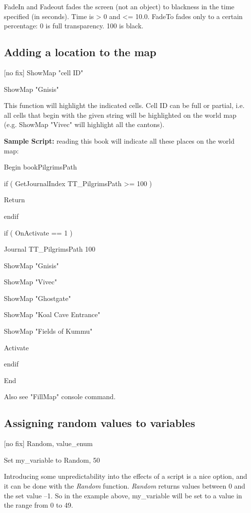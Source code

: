 \documentclass[
]{article}
\begin{document}
FadeIn and Fadeout fades the screen (not an object) to blackness in the
time specified (in seconds). Time is \textgreater{} 0 and \textless=
10.0. FadeTo fades only to a certain percentage: 0 is full transparency.
100 is black.

\hypertarget{adding-a-location-to-the-map}{%
\subsection{Adding a location to the
map}\label{adding-a-location-to-the-map}}

{[}no fix{]} ShowMap "cell ID"

ShowMap "Gnisis"

This function will highlight the indicated cells. Cell ID can be full or
partial, i.e. all cells that begin with the given string will be
highlighted on the world map (e.g. ShowMap "Vivec" will highlight all
the cantons).

\textbf{Sample Script:} reading this book will indicate all these places
on the world map:

Begin bookPilgrimsPath

if ( GetJournalIndex TT\_PilgrimsPath \textgreater= 100 )

Return

endif

if ( OnActivate == 1 )

Journal TT\_PilgrimsPath 100

ShowMap "Gnisis"

ShowMap "Vivec"

ShowMap "Ghostgate"

ShowMap "Koal Cave Entrance"

ShowMap "Fields of Kummu"

Activate

endif

End

Also see "FillMap" console command.

\hypertarget{assigning-random-values-to-variables}{%
\subsection{Assigning random values to
variables}\label{assigning-random-values-to-variables}}

{[}no fix{]} Random, value\_enum

Set my\_variable to Random, 50

Introducing some unpredictability into the effects of a script is a nice
option, and it can be done with the \emph{Random} function.
\emph{Random} returns values between 0 and the set value --1. So in the
example above, my\_variable will be set to a value in the range from 0
to 49.
\end{document}
